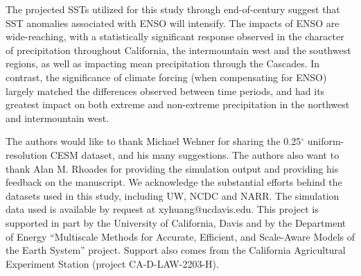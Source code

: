 \documentclass{ametsoc}
\begin{document}
The projected SSTs utilized for this study through end-of-century suggest that SST anomalies associated with ENSO will intensify. The impacts of ENSO are wide-reaching, with a statistically significant response observed in the character of precipitation throughout California, the intermountain west and the southwest regions, as well as impacting mean precipitation through the Cascades.  In contrast, the significance of climate forcing (when compensating for ENSO) largely matched the differences observed between time periods, and had its greatest impact on both extreme and non-extreme precipitation in the northwest and intermountain west.

\acknowledgments

The authors would like to thank Michael Wehner for sharing the 0.25$^\circ$ uniform-resolution CESM dataset, and his many suggestions. The authors also want to thank Alan M. Rhoades for providing the simulation output and providing his feedback on the manuscript. We acknowledge the substantial efforts behind the datasets used in this study, including UW, NCDC and NARR. The simulation data used is available by request at xyhuang@ucdavis.edu. This project is supported in part by the University of California, Davis and by the Department of Energy ``Multiscale Methods for Accurate, Efficient, and Scale-Aware Models of the Earth System'' project. Support also comes from the California Agricultural Experiment Station (project CA-D-LAW-2203-H). 

 
  



\end{document}
